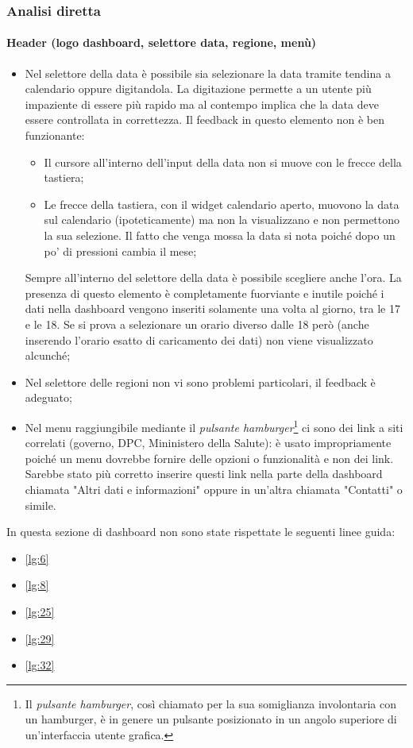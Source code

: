 \subsubsection{Analisi diretta}

\paragraph{Header (logo dashboard, selettore data, regione, menù)}
\begin{itemize}
    \item Nel selettore della data è possibile sia selezionare la data tramite tendina a calendario oppure digitandola. La digitazione permette a un utente più impaziente di essere più rapido ma al contempo implica che la data deve essere controllata in correttezza. Il feedback in questo elemento non è ben funzionante:
    \begin{itemize}
        \item Il cursore all'interno dell'input della data non si muove con le frecce della tastiera;
        \item Le frecce della tastiera, con il widget calendario aperto, muovono la data sul calendario (ipoteticamente) ma non la visualizzano e non permettono la sua selezione. Il fatto che venga mossa la data si nota poiché dopo un po' di pressioni cambia il mese;
    \end{itemize}
    Sempre all'interno del selettore della data è possibile scegliere anche l'ora. La presenza di questo elemento è completamente fuorviante e inutile poiché i dati nella dashboard vengono inseriti solamente una volta al giorno, tra le 17 e le 18. Se  si prova a selezionare un orario diverso dalle 18 però (anche inserendo l'orario esatto di caricamento dei dati) non viene visualizzato alcunché;
    \item Nel selettore delle regioni non vi sono problemi particolari, il feedback è adeguato;
    \item Nel menu raggiungibile mediante il \textit{pulsante hamburger}\footnote{Il \textit{pulsante hamburger}, così chiamato per la sua somiglianza involontaria con un hamburger, è in genere un pulsante posizionato in un angolo superiore di un'interfaccia utente grafica. } ci sono dei link a siti correlati (governo, DPC, Mininistero della Salute): è usato impropriamente poiché un menu dovrebbe fornire delle opzioni o funzionalità e non dei link. Sarebbe stato più corretto inserire questi link nella parte della dashboard chiamata "Altri dati e informazioni" oppure in un'altra chiamata "Contatti" o simile.
\end{itemize}
In questa sezione di dashboard non sono state rispettate le seguenti linee guida:
\begin{itemize}
    \item \ref{lg:6}
    \item \ref{lg:8}
    \item \ref{lg:25}
    \item \ref{lg:29}
    \item \ref{lg:32}
\end{itemize}

